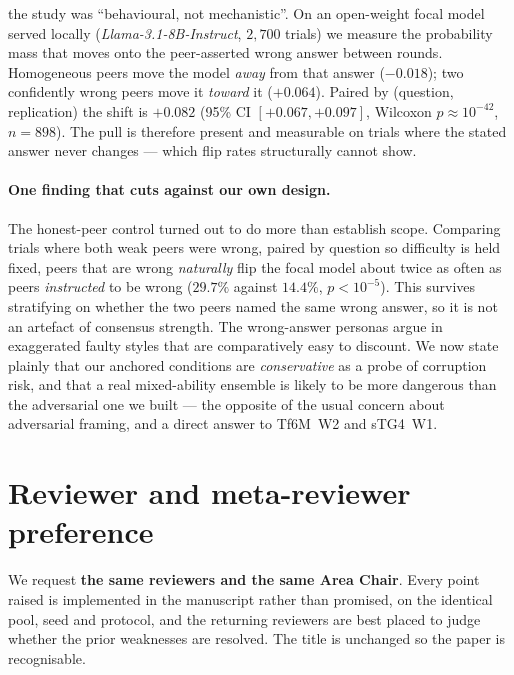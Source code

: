\documentclass[11pt]{article}
\begin{document}
\begin{itemize}
        the study was ``behavioural, not mechanistic''. On an open-weight focal
        model served locally (\textit{Llama-3.1-8B-Instruct}, $2{,}700$ trials)
        we measure the probability mass that moves onto the peer-asserted wrong
        answer between rounds. Homogeneous peers move the model \emph{away}
        from that answer ($-0.018$); two confidently wrong peers move it
        \emph{toward} it ($+0.064$). Paired by (question, replication) the
        shift is $+0.082$ (95\% CI $[+0.067,+0.097]$, Wilcoxon
        $p\approx10^{-42}$, $n=898$). The pull is therefore present and
        measurable on trials where the stated answer never changes --- which
        flip rates structurally cannot show.
\end{itemize}

\paragraph{One finding that cuts against our own design.}
The honest-peer control turned out to do more than establish scope. Comparing
trials where both weak peers were wrong, paired by question so difficulty is
held fixed, peers that are wrong \emph{naturally} flip the focal model about
twice as often as peers \emph{instructed} to be wrong ($29.7\%$ against
$14.4\%$, $p<10^{-5}$). This survives stratifying on whether the two peers
named the same wrong answer, so it is not an artefact of consensus strength.
The wrong-answer personas argue in exaggerated faulty styles that are
comparatively easy to discount. We now state plainly that our anchored
conditions are \emph{conservative} as a probe of corruption risk, and that a
real mixed-ability ensemble is likely to be more dangerous than the adversarial
one we built --- the opposite of the usual concern about adversarial framing,
and a direct answer to Tf6M~W2 and sTG4~W1.

\section*{Reviewer and meta-reviewer preference}

We request \textbf{the same reviewers and the same Area Chair}. Every point
raised is implemented in the manuscript rather than promised, on the identical
pool, seed and protocol, and the returning reviewers are best placed to judge
whether the prior weaknesses are resolved. The title is unchanged so the paper
is recognisable.
\end{document}
